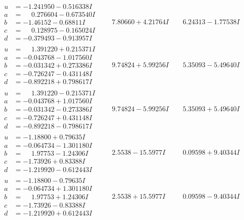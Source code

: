 \documentclass[1p]{elsarticle_modified}
\theoremstyle{definition}
\begin{document}
$$\begin{array}{c|c|c}
\begin{aligned}
u &= -1.241950 - 0.516338 I \\
a &= \phantom{-}0.276604 - 0.673540 I \\
b &= -1.46152 - 0.68811 I \\
c &= \phantom{-}0.128975 - 0.165024 I \\
d &= -0.379493 - 0.913957 I\end{aligned}
 & \phantom{-}7.80660 + 4.21764 I & \phantom{-}6.24313 - 1.77538 I \\ \hline\begin{aligned}
u &= \phantom{-}1.391220 + 0.215371 I \\
a &= -0.043768 - 1.017560 I \\
b &= -0.031342 + 0.273386 I \\
c &= -0.726247 - 0.431148 I \\
d &= -0.892218 + 0.798617 I\end{aligned}
 & \phantom{-}9.74824 + 5.99256 I & \phantom{-}5.35093 - 5.49640 I \\ \hline\begin{aligned}
u &= \phantom{-}1.391220 - 0.215371 I \\
a &= -0.043768 + 1.017560 I \\
b &= -0.031342 - 0.273386 I \\
c &= -0.726247 + 0.431148 I \\
d &= -0.892218 - 0.798617 I\end{aligned}
 & \phantom{-}9.74824 - 5.99256 I & \phantom{-}5.35093 + 5.49640 I \\ \hline\begin{aligned}
u &= -1.18800 + 0.79635 I \\
a &= -0.064734 - 1.301180 I \\
b &= \phantom{-}1.97753 - 1.24306 I \\
c &= -1.73926 + 0.83388 I \\
d &= -1.219920 - 0.612443 I\end{aligned}
 & \phantom{-}2.5538 - 15.5977 I & \phantom{-}0.09598 + 9.40344 I \\ \hline\begin{aligned}
u &= -1.18800 - 0.79635 I \\
a &= -0.064734 + 1.301180 I \\
b &= \phantom{-}1.97753 + 1.24306 I \\
c &= -1.73926 - 0.83388 I \\
d &= -1.219920 + 0.612443 I\end{aligned}
 & \phantom{-}2.5538 + 15.5977 I & \phantom{-}0.09598 - 9.40344 I\\

\end{array}$$
\end{document}
